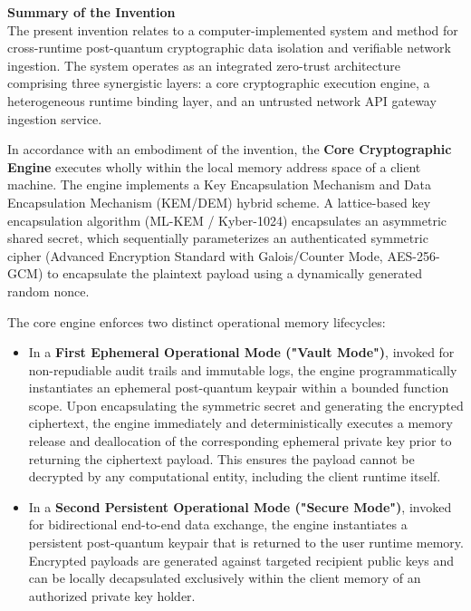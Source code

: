\documentclass[12pt, a4paper]{article}
\begin{document}
\vspace{1em}
\noindent \textbf{Summary of the Invention} \\
The present invention relates to a computer-implemented system and method for cross-runtime post-quantum cryptographic data isolation and verifiable network ingestion. The system operates as an integrated zero-trust architecture comprising three synergistic layers: a core cryptographic execution engine, a heterogeneous runtime binding layer, and an untrusted network API gateway ingestion service.

In accordance with an embodiment of the invention, the \textbf{Core Cryptographic Engine} executes wholly within the local memory address space of a client machine. The engine implements a Key Encapsulation Mechanism and Data Encapsulation Mechanism (KEM/DEM) hybrid scheme. A lattice-based key encapsulation algorithm (ML-KEM / Kyber-1024) encapsulates an asymmetric shared secret, which sequentially parameterizes an authenticated symmetric cipher (Advanced Encryption Standard with Galois/Counter Mode, AES-256-GCM) to encapsulate the plaintext payload using a dynamically generated random nonce.

The core engine enforces two distinct operational memory lifecycles:
\begin{itemize}
    \item In a \textbf{First Ephemeral Operational Mode ("Vault Mode")}, invoked for non-repudiable audit trails and immutable logs, the engine programmatically instantiates an ephemeral post-quantum keypair within a bounded function scope. Upon encapsulating the symmetric secret and generating the encrypted ciphertext, the engine immediately and deterministically executes a memory release and deallocation of the corresponding ephemeral private key prior to returning the ciphertext payload. This ensures the payload cannot be decrypted by any computational entity, including the client runtime itself.
    \item In a \textbf{Second Persistent Operational Mode ("Secure Mode")}, invoked for bidirectional end-to-end data exchange, the engine instantiates a persistent post-quantum keypair that is returned to the user runtime memory. Encrypted payloads are generated against targeted recipient public keys and can be locally decapsulated exclusively within the client memory of an authorized private key holder.
\end{itemize}
\end{document}
